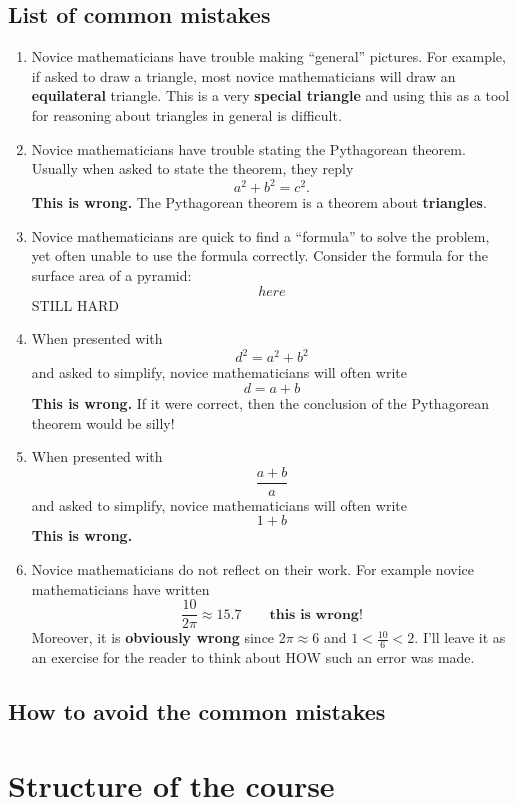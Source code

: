 \documentclass[handout,nooutcomes,noauthor]{ximera}
\begin{document}
\subsection*{List of common mistakes}
\begin{enumerate}
\item Novice mathematicians have trouble making ``general''
  pictures. For example, if asked to draw a triangle, most novice
  mathematicians will draw an \textbf{equilateral} triangle. This is a
  very \textbf{special triangle} and using this as a tool for
  reasoning about triangles in general is difficult.
\item Novice mathematicians have trouble stating the Pythagorean
  theorem. Usually when asked to state the theorem, they reply
  \[
  a^2+b^2=c^2.
  \]
  \textbf{This is wrong.} The Pythagorean theorem is a theorem
  about \textbf{triangles}. 
\item Novice mathematicians are quick to find a ``formula'' to solve
  the problem, yet often unable to use the formula correctly. Consider
  the formula for the surface area of a pyramid:
  \[
  here
  \]
  STILL HARD
\item When presented with
  \[
  d^2 = a^2 + b^2
  \]
  and asked to simplify, novice mathematicians will often write
  \[
  d = a +b
  \]
  \textbf{This is wrong.} If it were correct, then the
  conclusion of the Pythagorean theorem would be silly!
\item  When presented with
  \[
  \frac{a + b}{a}
  \]
  and asked to simplify, novice mathematicians will often write
  \[
  1+b
  \]
  \textbf{This is wrong.}
\item Novice mathematicians do not reflect on their work. For example
  novice mathematicians have written
  \[
  \frac{10}{2\pi} \approx  15.7\qquad\textbf{this is wrong!}
  \]
  Moreover, it is \textbf{obviously wrong} since $2\pi\approx 6$ and
  $1<\frac{10}{6} <2$. I'll leave it as an exercise for the reader to
  think about HOW such an error was made.
\end{enumerate}


\subsection*{How to avoid the common mistakes}




\section*{Structure of the course}
\end{document}
